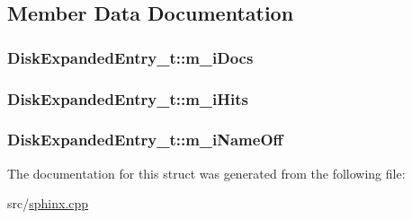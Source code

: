 \subsection{Member Data Documentation}
\hypertarget{structDiskExpandedEntry__t_a24b54a4db2b4344eed071cf8e6c0598c}{
\subsubsection[{m\-\_\-i\-Docs}]{ Disk\-Expanded\-Entry\-\_\-t\-::m\-\_\-i\-Docs}}\label{structDiskExpandedEntry__t_a24b54a4db2b4344eed071cf8e6c0598c}
\hypertarget{structDiskExpandedEntry__t_acfefa70d19307aa8ef63d3c2e38fd494}{
\subsubsection[{m\-\_\-i\-Hits}]{ Disk\-Expanded\-Entry\-\_\-t\-::m\-\_\-i\-Hits}}\label{structDiskExpandedEntry__t_acfefa70d19307aa8ef63d3c2e38fd494}
\hypertarget{structDiskExpandedEntry__t_aa89a6ad092073a71a9d178424e5bfadd}{
\subsubsection[{m\-\_\-i\-Name\-Off}]{ Disk\-Expanded\-Entry\-\_\-t\-::m\-\_\-i\-Name\-Off}}\label{structDiskExpandedEntry__t_aa89a6ad092073a71a9d178424e5bfadd}


The documentation for this struct was generated from the following file\-:\begin{DoxyCompactItemize}
\item 
src/\hyperlink{sphinx_8cpp}{sphinx.\-cpp}\end{DoxyCompactItemize}
